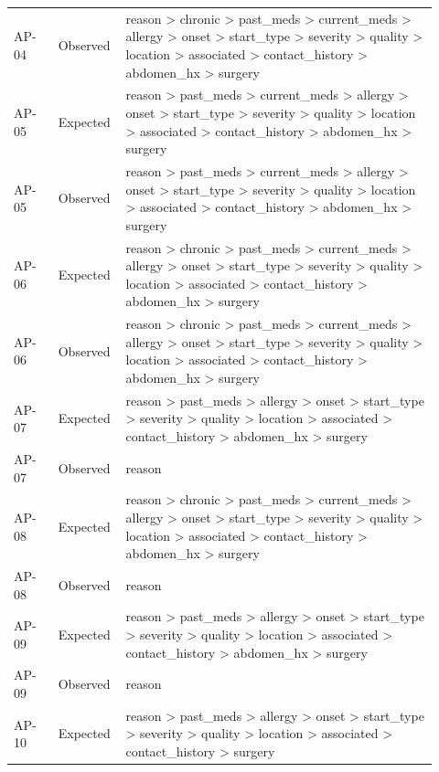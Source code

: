 \begin{longtable}{>{\raggedright\arraybackslash}p{0.1\linewidth}>{\raggedright\arraybackslash}p{0.12\linewidth}>{\raggedright\arraybackslash}p{0.7\linewidth}}
AP-\allowbreak{}04 & Observed & reason > chronic > past\_\allowbreak{}meds > current\_\allowbreak{}meds > allergy > onset > start\_\allowbreak{}type > severity > quality > location > associated > contact\_\allowbreak{}history > abdomen\_\allowbreak{}hx > surgery \\
AP-\allowbreak{}05 & Expected & reason > past\_\allowbreak{}meds > current\_\allowbreak{}meds > allergy > onset > start\_\allowbreak{}type > severity > quality > location > associated > contact\_\allowbreak{}history > abdomen\_\allowbreak{}hx > surgery \\
AP-\allowbreak{}05 & Observed & reason > past\_\allowbreak{}meds > current\_\allowbreak{}meds > allergy > onset > start\_\allowbreak{}type > severity > quality > location > associated > contact\_\allowbreak{}history > abdomen\_\allowbreak{}hx > surgery \\
AP-\allowbreak{}06 & Expected & reason > chronic > past\_\allowbreak{}meds > current\_\allowbreak{}meds > allergy > onset > start\_\allowbreak{}type > severity > quality > location > associated > contact\_\allowbreak{}history > abdomen\_\allowbreak{}hx > surgery \\
AP-\allowbreak{}06 & Observed & reason > chronic > past\_\allowbreak{}meds > current\_\allowbreak{}meds > allergy > onset > start\_\allowbreak{}type > severity > quality > location > associated > contact\_\allowbreak{}history > abdomen\_\allowbreak{}hx > surgery \\
AP-\allowbreak{}07 & Expected & reason > past\_\allowbreak{}meds > allergy > onset > start\_\allowbreak{}type > severity > quality > location > associated > contact\_\allowbreak{}history > abdomen\_\allowbreak{}hx > surgery \\
AP-\allowbreak{}07 & Observed & reason \\
AP-\allowbreak{}08 & Expected & reason > chronic > past\_\allowbreak{}meds > current\_\allowbreak{}meds > allergy > onset > start\_\allowbreak{}type > severity > quality > location > associated > contact\_\allowbreak{}history > abdomen\_\allowbreak{}hx > surgery \\
AP-\allowbreak{}08 & Observed & reason \\
AP-\allowbreak{}09 & Expected & reason > past\_\allowbreak{}meds > allergy > onset > start\_\allowbreak{}type > severity > quality > location > associated > contact\_\allowbreak{}history > abdomen\_\allowbreak{}hx > surgery \\
AP-\allowbreak{}09 & Observed & reason \\
AP-\allowbreak{}10 & Expected & reason > past\_\allowbreak{}meds > allergy > onset > start\_\allowbreak{}type > severity > quality > location > associated > contact\_\allowbreak{}history > surgery \\

\end{longtable}
